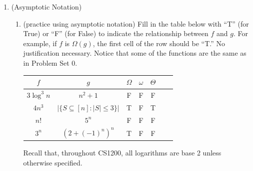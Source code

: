 \documentclass[11pt]{article}
\begin{document}
\begin{enumerate}
    \item (Asymptotic Notation) 
    \begin{enumerate}
    \item (practice using asymptotic notation)
        Fill in the table below with ``T'' (for True) or ``F'' (for False) to indicate the relationship between $f$ and $g$. For example, if $f$ is $\Omega(g)$, the first cell of the row should be ``T.''   No justification necessary.  Notice that some of the functions are the same as in Problem Set 0.\\
        \begin{table}[h!]
        \centering
        \bgroup
        \def\arraystretch{1.3}
        \begin{tabular}{||c | c || c | c | c | c | c ||}
         \hline
         $f$ & $g$ & $\Omega$ & $\omega$ & $\Theta$ \\
         \hline\hline
         $3\log ^3 n$ & $n^2+1$ & F & F & F \\ \hline
         $4n^3$ & $\left| \{S \subseteq [n] : |S|\leq 3\}\right|$ & T & F  & T \\ \hline
         $n!$ & $5^n$ & F & F & F \\ \hline
         $3^n$ & $\left(2+(-1)^n\right)^n$ & T & F & F\\ \hline
        \end{tabular}
        \egroup
        \end{table}
        Recall that, throughout CS1200, all logarithms are base 2 unless otherwise specified. 
        

\end{enumerate}
\end{enumerate}
\end{document}
